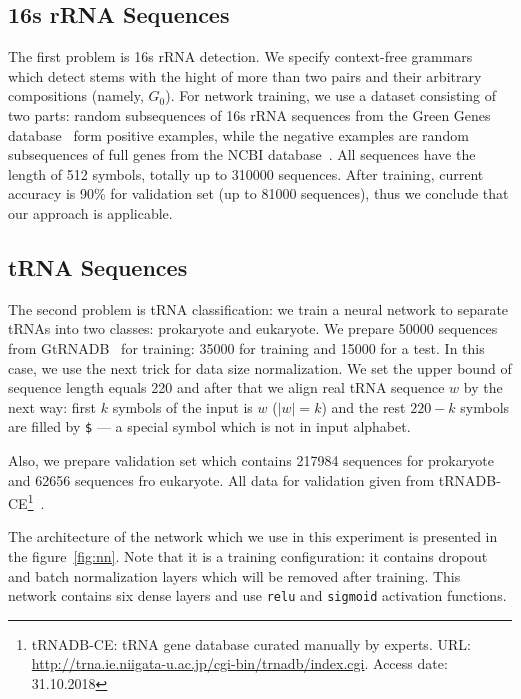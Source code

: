 \documentclass[a4paper,twoside]{article}
\begin{document}
\subsection{16s rRNA Sequences}
\noindent The first problem is 16s rRNA detection.
We specify context-free grammars which detect stems with the hight of more than two pairs and their arbitrary compositions (namely, $G_0$).
For network training, we use a dataset consisting of two parts: random subsequences of 16s rRNA sequences from the Green Genes database~\cite{pmid16820507} form positive examples, while the negative examples are random subsequences of full genes from the NCBI database~\cite{pmid19854944}.
All sequences have the length of 512 symbols, totally up to 310000 sequences.
After training, current accuracy is 90\% for validation set (up to 81000 sequences), thus we conclude that our approach is applicable.

\subsection{tRNA Sequences}

\noindent The second problem is tRNA classification: we train a neural network to separate tRNAs into two classes: prokaryote and eukaryote.
We prepare 50000 sequences from GtRNADB~\cite{Chan2009} for training: 35000 for training and 15000 for a test.
In this case, we use the next trick for data size normalization.
We set the upper bound of sequence length equals 220 and after that we align real tRNA sequence $w$ by the next way: first $k$ symbols of the input is $w$ ($|w|=k$) and the rest $220-k$ symbols are filled by \verb|$| --- a special symbol which is not in input alphabet.

Also, we prepare validation set which contains 217984 sequences for prokaryote and 62656 sequences fro eukaryote.
All data for validation given from tRNADB-CE\footnote{tRNADB-CE: tRNA gene database curated manually by experts. URL: \url{http://trna.ie.niigata-u.ac.jp/cgi-bin/trnadb/index.cgi}. Access date: 31.10.2018}~\cite{Abe2010}.

The architecture of the network which we use in this experiment is presented in the figure~\ref{fig:nn}.
Note that it is a training configuration: it contains dropout and batch normalization layers which will be removed after training.
This network contains six dense layers and use \verb|relu| and \verb|sigmoid| activation functions.
\end{document}
